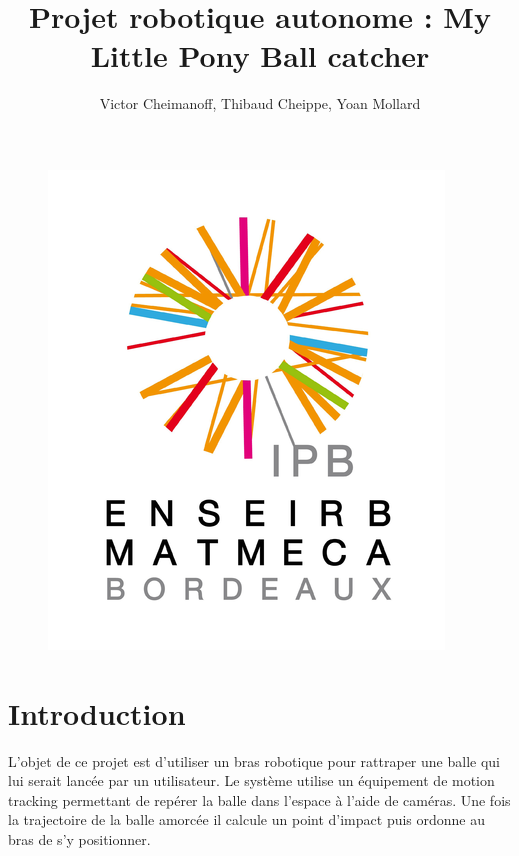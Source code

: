 \documentclass{article}[11pt]
\begin{document}
\Large

\title{Projet robotique autonome : \textbf{My Little Pony Ball catcher}}

\author{Victor Cheimanoff, Thibaud Cheippe, Yoan Mollard}

\maketitle

\normalsize

\tableofcontents

\begin{figure}[!htc]
	\begin{center}
		\includegraphics[scale=0.3]{images/logo_enseirb.png}
	\end{center}
\end{figure}

\newpage

\section{Introduction}

L'objet de ce projet est d'utiliser un bras robotique pour rattraper une balle qui lui serait lancée par un utilisateur. Le système utilise un équipement de motion tracking permettant de repérer la balle dans l'espace à l'aide de caméras. Une fois la trajectoire de la balle amorcée il calcule un point d'impact puis ordonne au bras de s'y positionner. \\
\end{document}
